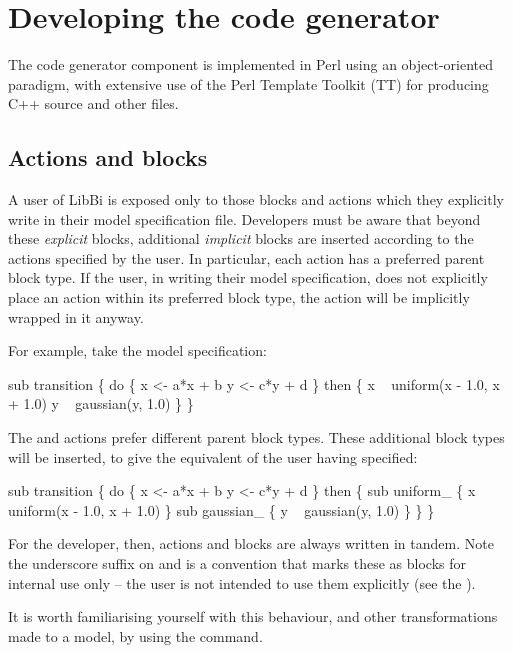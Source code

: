 \section{Developing the code generator}

The code generator component is implemented in Perl using an object-oriented
paradigm, with extensive use of the Perl Template Toolkit (TT) for producing
C++ source and other files.

\subsection{Actions and blocks}

A user of LibBi is exposed only to those blocks and actions which they
explicitly write in their model specification file. Developers must be aware
that beyond these \textit{explicit} blocks, additional \textit{implicit}
blocks are inserted according to the actions specified by the user. In
particular, each action has a preferred parent block type. If the user, in
writing their model specification, does not explicitly place an action within
its preferred block type, the action will be implicitly wrapped in it anyway.

For example, take the model specification:
\begin{bicode}
sub transition \{
  do \{
    x <- a*x + b
    y <- c*y + d
  \} then \{
    x ~ uniform(x - 1.0, x + 1.0)
    y ~ gaussian(y, 1.0)
  \}
\}
\end{bicode}
The  and  actions prefer different
parent block types. These additional block types will be inserted, to give the
equivalent of the user having specified:
\begin{bicode}
sub transition \{
  do \{
    x <- a*x + b
    y <- c*y + d
  \} then \{
    sub uniform_ \{
      x ~ uniform(x - 1.0, x + 1.0)
    \}
    sub gaussian_ \{
      y ~ gaussian(y, 1.0)
    \}
  \}  
\}
\end{bicode}

For the developer, then, actions and blocks are always written in tandem.
Note the underscore suffix on  and  is a
convention that marks these as blocks for internal use only -- the user is not
intended to use them explicitly (see the ).

It is worth familiarising yourself with this behaviour, and other
transformations made to a model, by using the  command.

